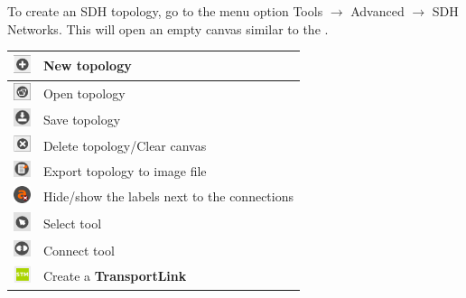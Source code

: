 \documentclass[a4paper]{article}
\begin{document}
		\newpage
		To create an SDH topology, go to the menu option Tools $\rightarrow$ Advanced $\rightarrow$ SDH Networks. This will open an empty canvas similar to the .
		\begin{table}[h!]
			\centering
			\begin{tabular}{lp{10cm}}
				\includegraphics[width=0.5cm]{img/icon_new_element.png} & New topology \\
				\midrule
				\includegraphics[width=0.5cm]{img/icon_open.png} & Open topology \\
				\midrule
				\includegraphics[width=0.5cm]{img/icon_save.png} & Save topology \\
				\midrule
				\includegraphics[width=0.5cm]{img/icon_delete.png} & Delete topology/Clear canvas \\
				\midrule
				\includegraphics[width=0.5cm]{img/icon_export.png} & Export topology to image file \\
				\midrule
				\includegraphics[width=0.5cm]{img/icon_toggle_conn_labels.png} & Hide/show the labels next to the connections\\
				\midrule
				\includegraphics[width=0.5cm]{img/icon_select_tool.png} & Select tool \\
				\midrule
				\includegraphics[width=0.5cm]{img/icon_connect_tool.png} & Connect tool \\
				\midrule
				\includegraphics[width=0.5cm]{img/sdh_module_transport_link.png} & Create a \textbf{TransportLink} \\

\end{tabular}
\end{table}
\end{document}
